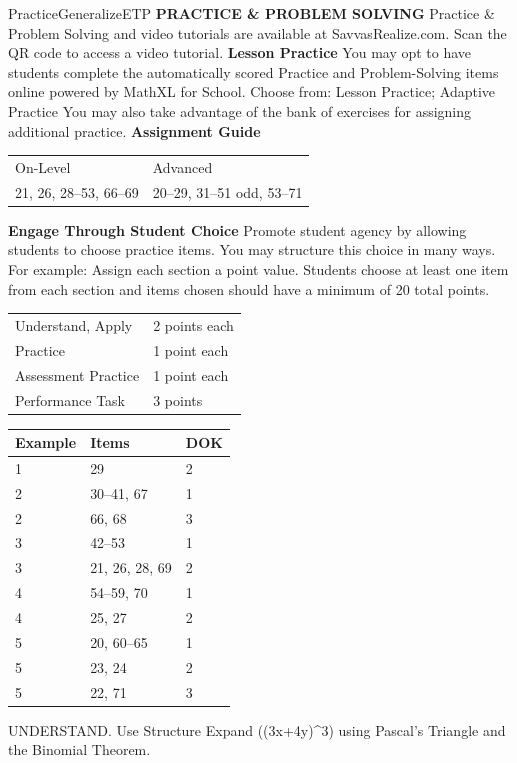 \documentclass{article}
\newenvironment{item-analysis}{}{}      %
\newenvironment{practice}[2]{}{}        %
\newenvironment{te-addendum}[2]{}{}     %
\newcommand{\answer}[1]{}               %
\begin{document}
\begin{te-addendum}{Practice}{GeneralizeETP}
\textbf{PRACTICE \& PROBLEM SOLVING}
Practice \& Problem Solving and video tutorials are available at SavvasRealize.com.
Scan the QR code to access a video tutorial.
\textbf{Lesson Practice} You may opt to have students complete the automatically scored Practice and Problem-Solving items online powered by MathXL for School.
Choose from: Lesson Practice; Adaptive Practice
You may also take advantage of the bank of exercises for assigning additional practice.
\textbf{Assignment Guide}
\begin{tabular}{ll}
On-Level & Advanced \\
21, 26, 28--53, 66--69 & 20--29, 31--51 odd, 53--71 \\
\end{tabular}
\textbf{Engage Through Student Choice}
Promote student agency by allowing students to choose practice items. You may structure this choice in many ways.
For example:
Assign each section a point value. Students choose at least one item from each section and items chosen should have a minimum of 20 total points.
\begin{tabular}{ll}
Understand, Apply & 2 points each \\
Practice & 1 point each \\
Assessment Practice & 1 point each \\
Performance Task & 3 points \\
\end{tabular}
\end{te-addendum}
\begin{item-analysis}
\begin{tabular}{lll}
\toprule
Example & Items & DOK \\
\midrule
1 & 29 & 2 \\
2 & 30--41, 67 & 1 \\
2 & 66, 68 & 3 \\
3 & 42--53 & 1 \\
3 & 21, 26, 28, 69 & 2 \\
4 & 54--59, 70 & 1 \\
4 & 25, 27 & 2 \\
5 & 20, 60--65 & 1 \\
5 & 23, 24 & 2 \\
5 & 22, 71 & 3 \\
\bottomrule
\end{tabular}
\end{item-analysis}
\begin{practice}{20}{1}
UNDERSTAND. Use Structure Expand ((3x+4y)^3) using Pascal's Triangle and the Binomial Theorem.
\answer{(27x^3+108x^2y+144xy^2+64y^3)}
\end{practice}
\end{document}
